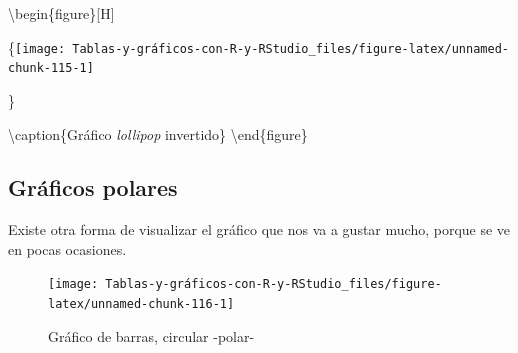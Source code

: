 \documentclass[
]{book}
\newenvironment{Shaded}{\begin{snugshade}}{\end{snugshade}}
\newcommand{\AttributeTok}[1]{\textcolor[rgb]{0.77,0.63,0.00}{#1}}
\newcommand{\ConstantTok}[1]{\textcolor[rgb]{0.00,0.00,0.00}{#1}}
\newcommand{\FunctionTok}[1]{\textcolor[rgb]{0.00,0.00,0.00}{#1}}
\newcommand{\NormalTok}[1]{#1}
\newcommand{\SpecialCharTok}[1]{\textcolor[rgb]{0.00,0.00,0.00}{#1}}
\newcommand{\StringTok}[1]{\textcolor[rgb]{0.31,0.60,0.02}{#1}}
\begin{document}
\textbackslash begin\{figure\}{[}H{]}

\{\centering \texttt{[image: Tablas-y-gráficos-con-R-y-RStudio\_files/figure-latex/unnamed-chunk-115-1]}

\}

\textbackslash caption\{Gráfico \emph{lollipop} invertido\}\label{fig:unnamed-chunk-115}
\textbackslash end\{figure\}

\hypertarget{gruxe1ficos-polares}{%
\subsection{Gráficos polares}\label{gruxe1ficos-polares}}

Existe otra forma de visualizar el gráfico que nos va a gustar mucho, porque se ve en pocas ocasiones.

\begin{Shaded}
\end{Shaded}

\begin{figure}[H]

{\centering \texttt{[image: Tablas-y-gráficos-con-R-y-RStudio\_files/figure-latex/unnamed-chunk-116-1]} 

}

\caption{Gráfico de barras, circular -polar-}\label{fig:unnamed-chunk-116}
\end{figure}
\end{document}
